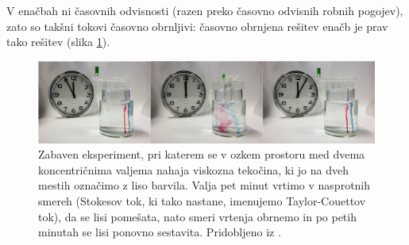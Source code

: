 \setlength{\textheight}{26.4cm}
\pagebreak
\setlength{\topmargin}{1.6cm}			%
\setlength{\headheight}{0.0cm}
\setlength{\headsep}{0.0cm}			%
\fancyhf{}
\fancyfoot[C]{\thepage}

V enačbah ni časovnih odvisnosti (razen preko časovno odvisnih robnih pogojev), zato so takšni tokovi časovno obrnljivi: časovno obrnjena rešitev enačb je prav tako rešitev (slika \ref{fig:TaylorCouette}).

\begin{figure}[!ht]
	\includegraphics[width = 1\textwidth]{Slike/TaylorCouette}
	\caption{Zabaven eksperiment, pri katerem se v ozkem prostoru med dvema koncentričnima valjema nahaja viskozna tekočina, ki jo na dveh mestih označimo z liso barvila. Valja pet minut vrtimo v nasprotnih smereh (Stokesov tok, ki tako nastane, imenujemo Taylor-Couettov tok), da se lisi pomešata, nato smeri vrtenja obrnemo in po petih minutah se lisi ponovno sestavita. Pridobljeno iz  \cite{Wiki-StokesFlow}.}
	\label{fig:TaylorCouette}
\end{figure}


